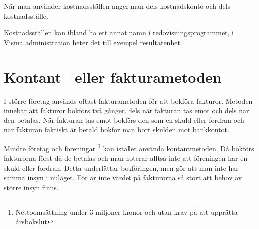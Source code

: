 När man använder kostnadsställen anger man dels kostnadskonto och dels kostnadsställe.

Kostnadsställen kan ibland ha ett annat namn i redovisningsprogrammet, i Visma administration heter det till exempel resultatenhet.

\section{Kontant-- eller fakturametoden}
I större företag används oftast fakturametoden för att bokföra fakturor. Metoden innebär att fakturor bokförs två gånger, dels när fakturan tas emot och dels när den betalas. När fakturan tas emot bokförs den som en skuld eller fordran och när fakturan faktiskt är betald bokför man bort skulden mot bankkontot.

Mindre företag och föreningar \footnote{Nettoomsättning under 3 miljoner kronor och utan krav på att upprätta årsbokslut} kan istället använda kontantmetoden. Då bokförs fakturorna först då de betalas och man noterar alltså inte att föreningen har en skuld eller fordran. Detta underlättar bokföringen, men gör att man inte har samma insyn i nuläget. För  är inte värdet på fakturorna så stort att behov av större insyn finns. 

